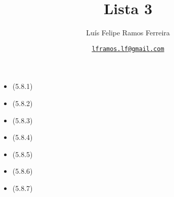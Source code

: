 \documentclass{article}
\title{Lista 3}
\author{Luís Felipe Ramos Ferreira}
\date{\href{mailto:lframos.lf@gmail.com}{\texttt{lframos.lf@gmail.com}}
}
\begin{document}
\maketitle

\begin{itemize}
	\item (5.8.1)
	\item (5.8.2)
	\item (5.8.3)
	\item (5.8.4)
	\item (5.8.5)
	\item (5.8.6)
	\item (5.8.7)
\end{itemize}
\end{document}
